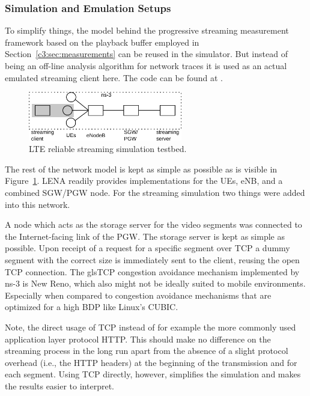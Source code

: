 \subsubsection{Simulation and Emulation Setups}

To simplify things, the model behind the progressive streaming measurement framework based on the playback buffer employed in Section~\ref{c3:sec:measurements} can be reused in the simulator. But instead of being an off-line analysis algorithm for network traces it is used as an actual emulated streaming client here. The code can be found at .

\begin{figure}[htb]
	\centering
	\includegraphics[width=0.6\textwidth]{images/streaming-simulation.pdf}
	\caption{\gls{LTE} reliable streaming simulation testbed.}
\label{c5:fig:streaming-simulation}
\end{figure}

The rest of the network model is kept as simple as possible as is visible in Figure~\ref{c5:fig:streaming-simulation}. LENA readily provides implementations for the \glspl{UE}, \gls{eNB}, and a combined \gls{SGW}/\gls{PGW} node. For the streaming simulation two things were added into this network. 

A node which acts as the storage server for the video segments was connected to the Internet-facing link of the \gls{PGW}. The storage server is kept as simple as possible. Upon receipt of a request for a specific segment over \gls{TCP} a dummy segment with the correct size is immediately sent to the client, reusing the open \gls{TCP} connection. 
The gls{TCP} congestion avoidance mechanism implemented by ns-3 is New Reno, which also might not be ideally suited to mobile environments. Especially when compared to congestion avoidance mechanisms that are optimized for a high \gls{BDP} like Linux's CUBIC.

Note, the direct usage of \gls{TCP} instead of for example the more commonly used application layer protocol \gls{HTTP}. This should make no difference on the streaming process in the long run apart from the absence of a slight protocol overhead (i.e., the \gls{HTTP} headers) at the beginning of the transmission and for each segment. Using \gls{TCP} directly, however, simplifies the simulation and makes the results easier to interpret.

